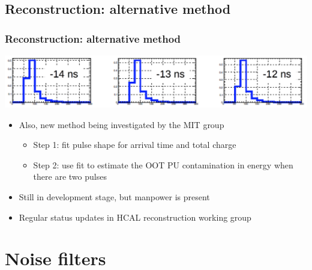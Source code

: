 \documentclass[bigger]{beamer}
\begin{document}
\subsection{Reconstruction: alternative method}
\label{sec-3-3}
\begin{frame}
\frametitle{Reconstruction: alternative method}
\label{sec-3-3-1}
\label{sec-3-3-1-1}

\centering
\includegraphics[width=\textwidth]{fig/hcal25_MIT.png}
\begin{itemize}

\item Also, new method being investigated by the MIT group
\label{sec-3-3-1-2}%
\begin{itemize}

\item Step 1: fit pulse shape for arrival time and total charge
\label{sec-3-3-1-2-1}%

\item Step 2: use fit to estimate the OOT PU contamination in energy when there are two pulses
\label{sec-3-3-1-2-2}%
\end{itemize} %

\item Still in development stage, but manpower is present
\label{sec-3-3-1-3}%

\item Regular status updates in HCAL reconstruction working group
\label{sec-3-3-1-4}%
\end{itemize} %
\end{frame}
\section{Noise filters}
\label{sec-4}
\end{document}
